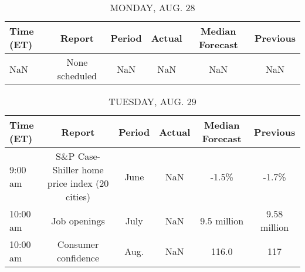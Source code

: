 \documentclass{article}%
\begin{document}
%
\normalsize%


\begin{table}[htbp]%
\caption{MONDAY, AUG. 28}%
\centering%
\begin{adjustbox}{width=1\textwidth}%
\begin{tabular}{lccccc}
\toprule
Time (ET) &         Report & Period & Actual & Median Forecast & Previous \\
\midrule
      NaN & None scheduled &    NaN &    NaN &             NaN &      NaN \\
\bottomrule
\end{tabular}
%
\end{adjustbox}%
\end{table}

%


\begin{table}[htbp]%
\caption{TUESDAY, AUG. 29}%
\centering%
\begin{adjustbox}{width=1\textwidth}%
\begin{tabular}{lccccc}
\toprule
Time (ET) &                                        Report & Period & Actual & Median Forecast &     Previous \\
\midrule
  9:00 am & S\&P Case-Shiller home price index (20 cities) &   June &    NaN &           -1.5\% &        -1.7\% \\
 10:00 am &                                  Job openings &   July &    NaN &     9.5 million & 9.58 million \\
 10:00 am &                           Consumer confidence &   Aug. &    NaN &           116.0 &          117 \\
\bottomrule
\end{tabular}
%
\end{adjustbox}%
\end{table}

%
\end{document}
